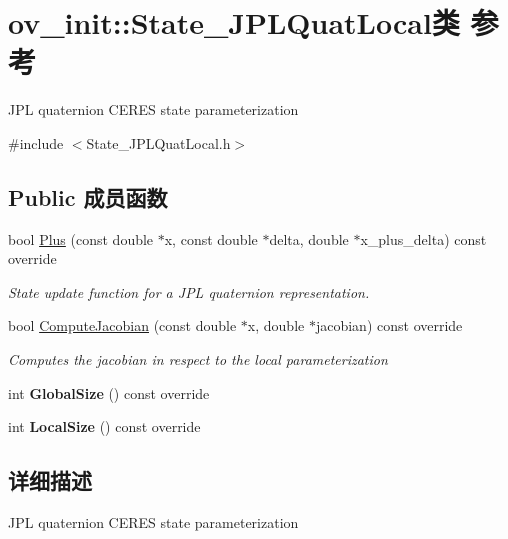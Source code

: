 \hypertarget{classov__init_1_1State__JPLQuatLocal}{}\section{ov\+\_\+init\+:\+:State\+\_\+\+J\+P\+L\+Quat\+Local类 参考}
\label{classov__init_1_1State__JPLQuatLocal}


J\+PL quaternion C\+E\+R\+ES state parameterization  




{\ttfamily \#include $<$State\+\_\+\+J\+P\+L\+Quat\+Local.\+h$>$}

\subsection*{Public 成员函数}
\begin{DoxyCompactItemize}
\item 
bool \hyperlink{classov__init_1_1State__JPLQuatLocal_ae0d6f02fa9043878a623bc46aee0c928}{Plus} (const double $\ast$x, const double $\ast$delta, double $\ast$x\+\_\+plus\+\_\+delta) const override
\begin{DoxyCompactList}\small\item\em State update function for a J\+PL quaternion representation. \end{DoxyCompactList}\item 
bool \hyperlink{classov__init_1_1State__JPLQuatLocal_ab6732d5027ddfa89a76d00ef35ee2fc8}{Compute\+Jacobian} (const double $\ast$x, double $\ast$jacobian) const override
\begin{DoxyCompactList}\small\item\em Computes the jacobian in respect to the local parameterization \end{DoxyCompactList}\item 
\mbox{\label{classov__init_1_1State__JPLQuatLocal_af801ab9594a21ccd98c5525ff121a399}} 
int {\bfseries Global\+Size} () const override
\item 
\mbox{\label{classov__init_1_1State__JPLQuatLocal_a2f8902e5be623d71aa7299b666afe4c8}} 
int {\bfseries Local\+Size} () const override
\end{DoxyCompactItemize}


\subsection{详细描述}
J\+PL quaternion C\+E\+R\+ES state parameterization 

